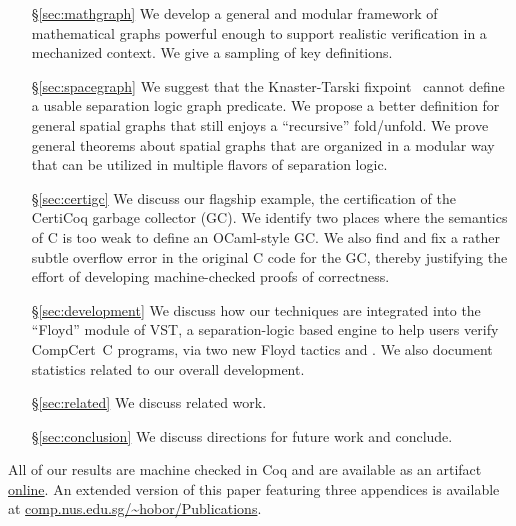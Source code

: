 \begin{itemize}
\item[\S\ref{sec:mathgraph}] We develop a general and modular framework of mathematical graphs powerful enough to support realistic verification in a mechanized context.  We give a sampling of key definitions.
\item[\S\ref{sec:spacegraph}] We suggest that the Knaster-Tarski fixpoint~\cite{tarski:fixpoint} cannot define a usable separation logic graph predicate.  We propose a better definition for general spatial graphs that still enjoys a ``recursive'' fold/unfold.  We prove general theorems about spatial graphs that are 
organized in a modular way that can be utilized in multiple flavors of separation logic. %
\item[\S\ref{sec:certigc}] We discuss our flagship example, the certification of the CertiCoq garbage collector (GC). We identify two places where the semantics of C is too weak to define an OCaml-style GC. We also find and fix a rather subtle overflow error in the original C code for the GC, thereby justifying the effort of developing machine-checked proofs of correctness.
\item[\S\ref{sec:development}] We discuss how our techniques are integrated into the
``Floyd'' module of VST, a separation-logic based engine to help users verify
CompCert~C programs, via two new Floyd tactics  and .
We also document statistics related to our overall development.
\item[\S\ref{sec:related}] We discuss related work.
\item[\S\ref{sec:conclusion}] We discuss directions for future work and conclude.
\end{itemize}
All of our results are machine checked in Coq and are available as an artifact 
\href{https://zenodo.org/record/3368779}{online}.
An extended version of this paper featuring three appendices is available 
at \href{https://www.comp.nus.edu.sg/~hobor/Publications/2019/autoquack_extended_oopsla19.pdf}{comp.nus.edu.sg/\textasciitilde{}hobor/Publications}.
